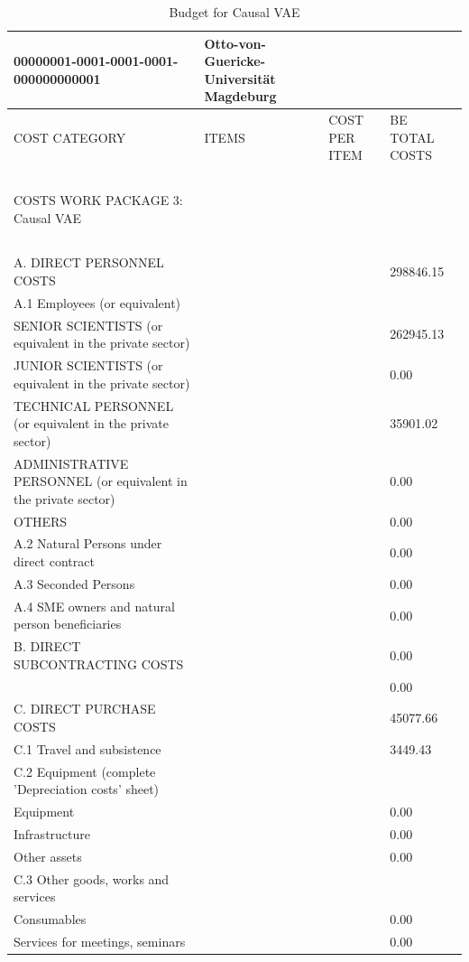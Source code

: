 \begin{table}[H]
\centering
\caption{Budget for Causal VAE}
\begin{tabular}{|l|l|l|l|}
\hline
00000001-0001-0001-0001-000000000001 & Otto-von-Guericke-Universität Magdeburg & ~ & ~ \\ \hline
COST CATEGORY & ITEMS & COST PER ITEM & BE TOTAL COSTS \\ \hline
~ & ~ & ~ & ~ \\ \hline
COSTS WORK PACKAGE 3: Causal VAE & ~ & ~ & ~ \\ \hline
~ & ~ & ~ & ~ \\ \hline
A. DIRECT PERSONNEL COSTS & ~ & ~ & 298846.15 \\ \hline
A.1 Employees (or equivalent) & ~ & ~ & ~ \\ \hline
SENIOR SCIENTISTS (or equivalent in the private sector) & ~ & ~ & 262945.13 \\ \hline
JUNIOR SCIENTISTS (or equivalent in the private sector) & ~ & ~ & 0.00 \\ \hline
TECHNICAL PERSONNEL (or equivalent in the private sector) & ~ & ~ & 35901.02 \\ \hline
ADMINISTRATIVE PERSONNEL (or equivalent in the private sector) & ~ & ~ & 0.00 \\ \hline
OTHERS & ~ & ~ & 0.00 \\ \hline
A.2 Natural Persons under direct contract & ~ & ~ & 0.00 \\ \hline
A.3 Seconded Persons & ~ & ~ & 0.00 \\ \hline
A.4 SME owners and natural person beneficiaries & ~ &  & 0.00 \\ \hline
B. DIRECT SUBCONTRACTING COSTS & ~ & ~ & 0.00\\ \hline
~ & ~ & ~ & 0.00 \\ \hline
C. DIRECT PURCHASE COSTS & ~ & ~ & 45077.66 \\ \hline
C.1 Travel and subsistence & ~ &  & 3449.43 \\ \hline
C.2 Equipment (complete 'Depreciation costs' sheet) & ~ & ~ & ~ \\ \hline
Equipment & ~ &  & 0.00 \\ \hline
Infrastructure & ~ &  & 0.00 \\ \hline
Other assets & ~ &  & 0.00 \\ \hline
C.3 Other goods, works and services & ~ & ~ & ~ \\ \hline
Consumables & ~ &  & 0.00 \\ \hline
Services for meetings, seminars & ~ & ~ & 0.00 \\ \hline

\end{tabular}
\end{table}
